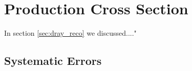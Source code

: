 \section{\deltaray Production Cross Section}
\label{sec:xsec}
In section \ref{sec:dray_reco} we discussed...."
\subsection{Systematic Errors}

